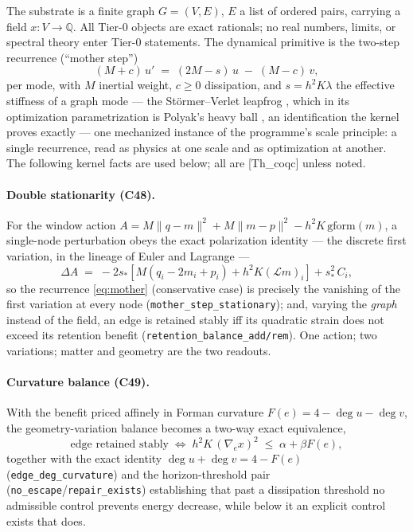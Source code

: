 \documentclass[10pt,twocolumn]{article}
\theoremstyle{definition}
\newcommand{\Thq}{\textsf{[Th\_coqc]}}
\newcommand{\code}[1]{\texttt{#1}}
\begin{document}
The substrate is a finite graph $G=(V,E)$, $E$ a list of ordered pairs, carrying a
field $x:V\to\mathbb{Q}$. All Tier-0 objects are exact rationals; no real numbers,
limits, or spectral theory enter Tier-0 statements. The dynamical primitive is the
two-step recurrence (``mother step'')
\begin{equation}
(M+c)\,u' \;=\; (2M-s)\,u \;-\; (M-c)\,v,
\label{eq:mother}
\end{equation}
per mode, with $M$ inertial weight, $c\ge 0$ dissipation, and $s = h^2 K \lambda$ the
effective stiffness of a graph mode --- the St\"ormer--Verlet leapfrog
\cite{stormer,verlet}, which in its optimization parametrization is Polyak's heavy ball
\cite{polyak}, an identification the kernel proves exactly --- one mechanized
instance of the programme's scale principle: a single recurrence, read as physics at
one scale and as optimization at another. The following kernel facts are used below; all
are \Thq{} unless noted.

\paragraph{Double stationarity (C48).} For the window action
$A = M\lVert q-m\rVert^2 + M\lVert m-p\rVert^2 - h^2K\,\mathrm{gform}(m)$,
a single-node perturbation obeys the exact polarization identity --- the discrete
first variation, in the lineage of Euler and Lagrange \cite{lagrange} ---
\begin{equation}
\Delta A \;=\; -2s_\ast\!\left[M(q_i-2m_i+p_i)+h^2K(\mathcal{L}m)_i\right]
 + s_\ast^2\,C_i,
\end{equation}
so the recurrence \eqref{eq:mother} (conservative case) is precisely the vanishing of
the first variation at every node (\code{mother\_step\_stationary}); and, varying the
\emph{graph} instead of the field, an edge is retained stably iff its quadratic strain
does not exceed its retention benefit (\code{retention\_balance\_add/rem}). One action;
two variations; matter and geometry are the two readouts.

\paragraph{Curvature balance (C49).} With the benefit priced affinely in Forman
curvature $F(e) = 4-\deg u - \deg v$, the geometry-variation balance becomes a two-way
exact equivalence,
\begin{equation}
\text{edge retained stably} \;\Longleftrightarrow\;
h^2K\,(\nabla_e x)^2 \;\le\; \alpha + \beta F(e),
\label{eq:balance}
\end{equation}
together with the exact identity $\deg u + \deg v = 4 - F(e)$
(\code{edge\_deg\_curvature}) and the horizon-threshold pair
(\code{no\_escape}/\code{repair\_exists}) establishing that past a dissipation
threshold no admissible control prevents energy decrease, while below it an explicit
control exists that does.
\end{document}
